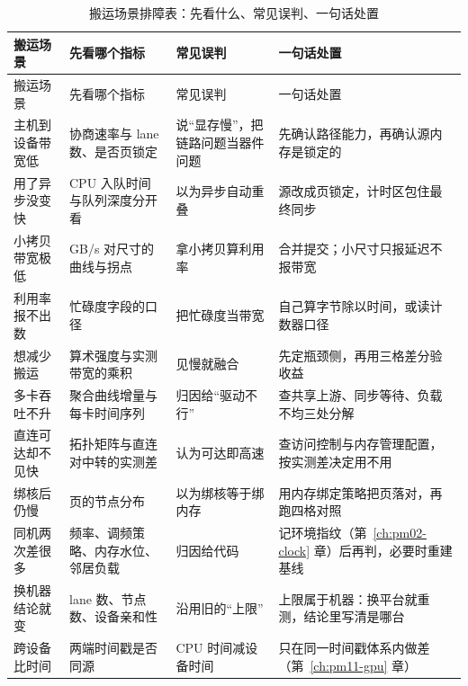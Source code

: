 \documentclass[12pt,a4paper,fontset=fandol]{ctexbook}
\begin{document}
\begin{longtable}{>{\raggedright\arraybackslash}p{} >{\raggedright\arraybackslash}p{} >{\raggedright\arraybackslash}p{} >{\raggedright\arraybackslash}p{}}
\caption{搬运场景排障表：先看什么、常见误判、一句话处置}\label{tab:pm12-transfer}\\
\toprule
搬运场景 & 先看哪个指标 & 常见误判 & 一句话处置 \\
\midrule
\endfirsthead
\toprule
搬运场景 & 先看哪个指标 & 常见误判 & 一句话处置 \\
\midrule
\endhead
\midrule
\bottomrule
\endlastfoot
主机到设备带宽低 & 协商速率与 lane 数、是否页锁定 & 说``显存慢''，把链路问题当器件问题 & 先确认路径能力，再确认源内存是锁定的 \\
用了异步没变快 & CPU 入队时间与队列深度分开看 & 以为异步自动重叠 & 源改成页锁定，计时区包住最终同步 \\
小拷贝带宽极低 & GB/s 对尺寸的曲线与拐点 & 拿小拷贝算利用率 & 合并提交；小尺寸只报延迟不报带宽 \\
利用率报不出数 & 忙碌度字段的口径 & 把忙碌度当带宽 & 自己算字节除以时间，或读计数器口径 \\
想减少搬运 & 算术强度与实测带宽的乘积 & 见慢就融合 & 先定瓶颈侧，再用三格差分验收益 \\
多卡吞吐不升 & 聚合曲线增量与每卡时间序列 & 归因给``驱动不行'' & 查共享上游、同步等待、负载不均三处分解 \\
直连可达却不见快 & 拓扑矩阵与直连对中转的实测差 & 认为可达即高速 & 查访问控制与内存管理配置，按实测差决定用不用 \\
绑核后仍慢 & 页的节点分布 & 以为绑核等于绑内存 & 用内存绑定策略把页落对，再跑四格对照 \\
同机两次差很多 & 频率、调频策略、内存水位、邻居负载 & 归因给代码 & 记环境指纹（第~\ref{ch:pm02-clock} 章）后再判，必要时重建基线 \\
换机器结论就变 & lane 数、节点数、设备亲和性 & 沿用旧的``上限'' & 上限属于机器：换平台就重测，结论里写清是哪台 \\
跨设备比时间 & 两端时间戳是否同源 & CPU 时间减设备时间 & 只在同一时间戳体系内做差（第~\ref{ch:pm11-gpu} 章） \\
\end{longtable}
\end{document}
